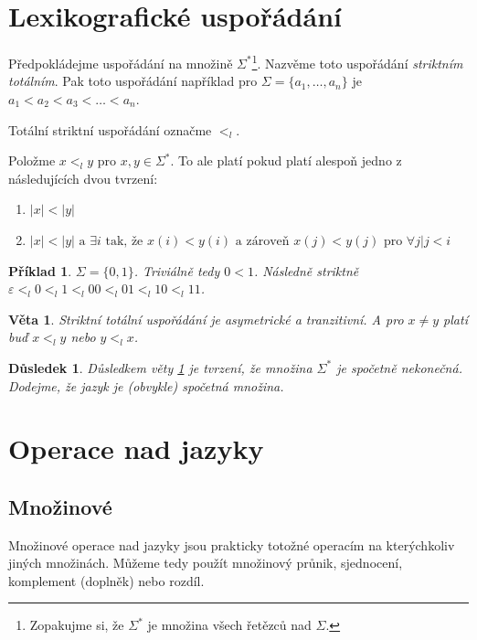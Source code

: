 \documentclass[10pt, a4paper, titlepage]{article}
\theoremstyle{note}
\newtheorem{veta}{\textbf{Věta}}
\newtheorem{priklad}{\textbf{Příklad}}
\newtheorem{dusledek}{\textbf{Důsledek}}
\begin{document}
\section{Lexikografické uspořádání}
Předpokládejme uspořádání na množině $\Sigma^{*}$\footnote{Zopakujme si, že $\Sigma^{*}$ je množina všech řetězců nad $\Sigma$.}.
Nazvěme toto uspořádání \emph{striktním totálním}. Pak toto uspořádání například pro $\Sigma = \lbrace a_{1}, \ldots, a_{n} \rbrace$
je $a_{1} < a_{2} < a_{3} < \ldots < a_{n}$.

Totální striktní uspořádání označme $<_{l}$.

Položme $x <_{l} y$ pro $x,y \in \Sigma^{*}$. To ale platí pokud platí alespoň jedno z následujících dvou tvrzení:
\begin{enumerate}
\item
$|x| < |y|$

\item
$|x| < |y| \text{ a } \exists i \text{ tak, že } x(i) < y(i) \text{ a zároveň } x(j) < y(j) \text{ pro } \forall j |j < i$
\end{enumerate}

\begin{priklad}
$\Sigma = \lbrace 0, 1 \rbrace$. Triviálně tedy $0 < 1$.
Následně striktně $\varepsilon <_{l} 0 <_{l} 1 <_{l} 00 <_{l} 01 <_{l} 10 <_{l} 11$.
\end{priklad}

\begin{veta} \label{veta-1}
Striktní totální uspořádání je asymetrické a tranzitivní. A pro $x \neq y$ platí buď $x <_{l} y$ nebo $y <_{l} x$.
\end{veta}

\begin{dusledek}
Důsledkem věty \ref{veta-1} je tvrzení, že množina $\Sigma^{*}$ je spočetně nekonečná. Dodejme, že jazyk je (obvykle) spočetná množina.
\end{dusledek}

\section{Operace nad jazyky}

\subsection{Množinové}
Množinové operace nad jazyky jsou prakticky totožné operacím na kterýchkoliv jiných množinách. Můžeme tedy použít množinový průnik, sjednocení, komplement (doplněk) nebo rozdíl.
\end{document}
